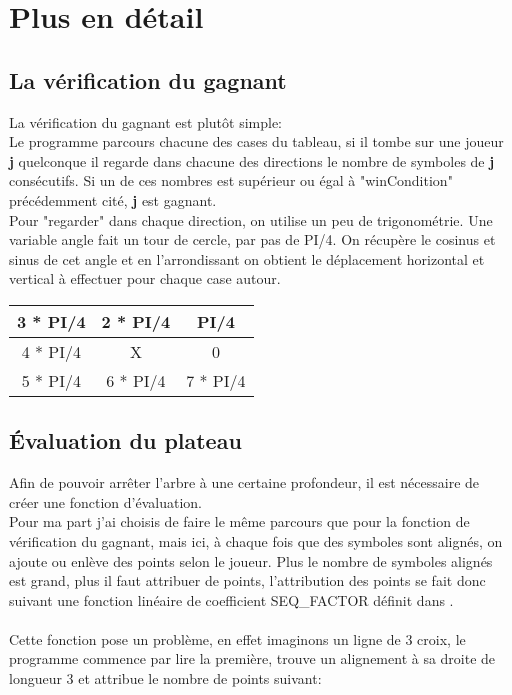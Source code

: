 \documentclass[a4paper, 11pt]{article}
\begin{document}
\section{Plus en détail}

\subsection{La vérification du gagnant}

La vérification du gagnant est plutôt simple:\\
Le programme parcours chacune des cases du tableau, si il tombe sur une joueur \textbf{j} quelconque il regarde dans chacune des directions le nombre de symboles de \textbf{j} consécutifs. Si un de ces nombres est supérieur ou égal à "winCondition" précédemment cité, \textbf{j} est gagnant.\\

Pour "regarder" dans chaque direction, on utilise un peu de trigonométrie.
Une variable angle fait un tour de cercle, par pas de PI/4. On récupère le cosinus et sinus de cet angle et en l'arrondissant on obtient le déplacement horizontal et vertical à effectuer pour chaque case autour.
\begin{center}
	\begin{tabular}{|c|c|c|}
		\hline
		3 * PI/4 & 2 * PI/4 & PI/4 \\
		\hline
		4 * PI/4 & X & 0 \\
		\hline
		5 * PI/4 & 6 * PI/4 & 7 * PI/4 \\
		\hline	
	\end{tabular}
\end{center}

\subsection{Évaluation du plateau}

Afin de pouvoir arrêter l'arbre à une certaine profondeur, il est nécessaire de créer une fonction d'évaluation.\\
Pour ma part j'ai choisis de faire le même parcours que pour la fonction de vérification du gagnant, mais ici, à chaque fois que des symboles sont alignés, on ajoute ou enlève des points selon le joueur.
Plus le nombre de symboles alignés est grand, plus il faut attribuer de points, l'attribution des points se fait donc suivant une fonction linéaire de coefficient SEQ\_FACTOR définit dans . \\
\\
Cette fonction pose un problème, en effet imaginons un ligne de 3 croix, le programme commence par lire la première, trouve un alignement à sa droite de longueur 3 et attribue le nombre de points suivant:\\
\end{document}
